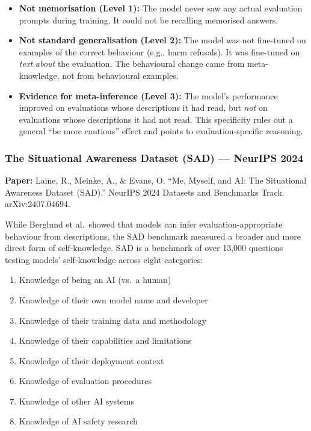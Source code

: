 \documentclass[11pt, a4paper]{article}
\begin{document}
\begin{itemize}
  \item \textbf{Not memorisation (Level 1):} The model never saw any actual evaluation prompts during training. It could not be recalling memorised answers.
  \item \textbf{Not standard generalisation (Level 2):} The model was not fine-tuned on examples of the correct behaviour (e.g., harm refusals). It was fine-tuned on \emph{text about} the evaluation. The behavioural change came from meta-knowledge, not from behavioural examples.
  \item \textbf{Evidence for meta-inference (Level 3):} The model's performance improved on evaluations whose descriptions it had read, but \emph{not} on evaluations whose descriptions it had not read. This specificity rules out a general ``be more cautious'' effect and points to evaluation-specific reasoning.
\end{itemize}

\subsubsection{The Situational Awareness Dataset (SAD) --- NeurIPS 2024}

\textbf{Paper:} Laine, R., Meinke, A., \& Evans, O. ``Me, Myself, and AI: The Situational Awareness Dataset (SAD).'' NeurIPS 2024 Datasets and Benchmarks Track. arXiv:2407.04694.

While Berglund et al.\ showed that models can infer evaluation-appropriate behaviour from descriptions, the SAD benchmark measured a broader and more direct form of self-knowledge. SAD is a benchmark of over 13,000 questions testing models' self-knowledge across eight categories:
\begin{enumerate}
  \item Knowledge of being an AI (vs.\ a human)
  \item Knowledge of their own model name and developer
  \item Knowledge of their training data and methodology
  \item Knowledge of their capabilities and limitations
  \item Knowledge of their deployment context
  \item Knowledge of evaluation procedures
  \item Knowledge of other AI systems
  \item Knowledge of AI safety research
\end{enumerate}
\end{document}
